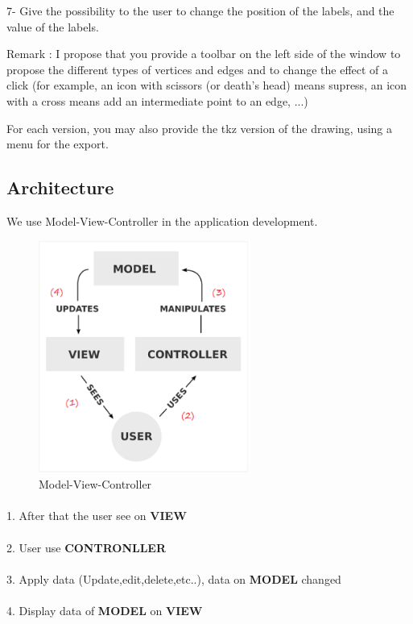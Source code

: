 \documentclass[a4paper,10pt]{article}
\begin{document}
7- Give the possibility to the user to change the position of the labels, and the value of the labels.

Remark : I propose that you provide a toolbar on the left side of the window to propose the different types of vertices and edges and to change the effect of a click (for example, an icon with scissors (or death's head) means supress, an icon with a cross means add an intermediate point to an edge, ...)

For each version, you may also provide the tkz version of the drawing, using a menu for the export.
\subsection{Architecture} 
We use Model-View-Controller in the application development.
\begin{figure}[H]
		\centering
		\includegraphics[height = 3in]{mvc.png}
		\caption[Optional caption]{Model-View-Controller}
		\label{fig:Repository}
	\end{figure}
\paragraph{}
1. After that the user see on \textbf{VIEW}
\paragraph{}
2. User use \textbf{CONTRONLLER}
\paragraph{}
3. Apply data (Update,edit,delete,etc..), data on \textbf{MODEL} changed
\paragraph{}
4. Display data of \textbf{MODEL} on \textbf{VIEW}
\end{document}

